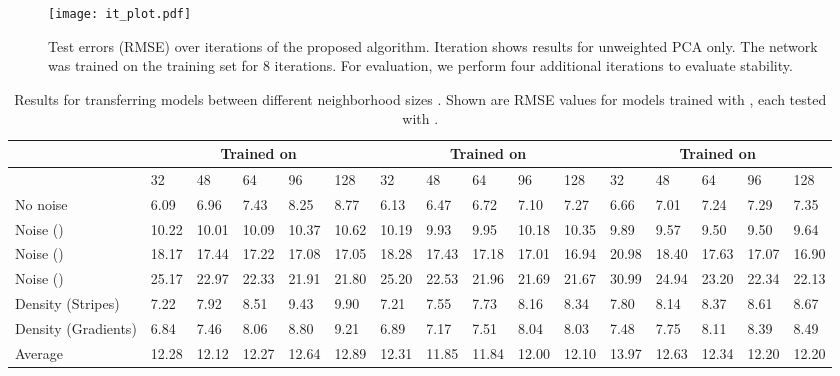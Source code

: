 \documentclass[10pt,twocolumn,letterpaper]{article}
\begin{document}
\begin{figure*}[t]
\centering
  \texttt{[image: it\_plot.pdf]}
  \caption{Test errors (RMSE) over iterations of the proposed algorithm. Iteration  shows results for unweighted PCA only. The network was trained on the training set for 8 iterations. For evaluation, we perform four additional iterations to evaluate stability.}
  \label{fig:iterations}
\end{figure*}

\begin{table*}[t]
\small
\setlength\tabcolsep{3.5pt}
\centering
\begin{tabular}{llllll|lllll|lllll}
\toprule
& \multicolumn{5}{c}{Trained on } & \multicolumn{5}{c}{Trained on } & \multicolumn{5}{c}{Trained on } \\
\midrule
 & 32  &  48  & 64 & 96 & 128 & 32  &  48  & 64 & 96 & 128 & 32  &  48  & 64 & 96 & 128  \\ 
\midrule
No noise  & 6.09 &  6.96 & 7.43 & 8.25 & 8.77 & 6.13  & 6.47 & 6.72 & 7.10 & 7.27 & 6.66 &  7.01 & 7.24 & 7.29 & 7.35 \\ 
Noise ()  & 10.22 & 10.01  & 10.09 & 10.37 & 10.62 & 10.19 &  9.93 & 9.95 & 10.18  & 10.35 & 9.89  & 9.57 & 9.50 & 9.50 & 9.64 \\ 
Noise ()   & 18.17 & 17.44 & 17.22 & 17.08 & 17.05 & 18.28 & 17.43 & 17.18 & 17.01 & 16.94 & 20.98 & 18.40 & 17.63 & 17.07 & 16.90 \\ 
Noise () & 25.17 & 22.97 & 22.33 & 21.91 & 21.80 & 25.20 & 22.53 & 21.96 & 21.69  & 21.67 & 30.99 & 24.94 & 23.20 & 22.34 &  22.13 \\ 
Density (Stripes)   &  7.22 & 7.92 & 8.51  & 9.43 & 9.90 & 7.21  & 7.55  &  7.73 & 8.16  &  8.34 &  7.80 & 8.14 &  8.37 & 8.61  & 8.67\\
Density (Gradients)   & 6.84 & 7.46 & 8.06 & 8.80 & 9.21 & 6.89 & 7.17 & 7.51 & 8.04  & 8.03 & 7.48 & 7.75 & 8.11 & 8.39 & 8.49 \\ 
\midrule
Average    & 12.28 & 12.12  & 12.27 & 12.64 & 12.89 & 12.31 & 11.85 & 11.84 & 12.00  & 12.10 & 13.97 & 12.63  & 12.34 & 12.20 & 12.20 \\ 
\bottomrule
\end{tabular}
\caption{Results for transferring models between different neighborhood sizes . Shown are RMSE values for models trained with , each tested with .}
\label{tab:transfer}
\end{table*}
\end{document}
